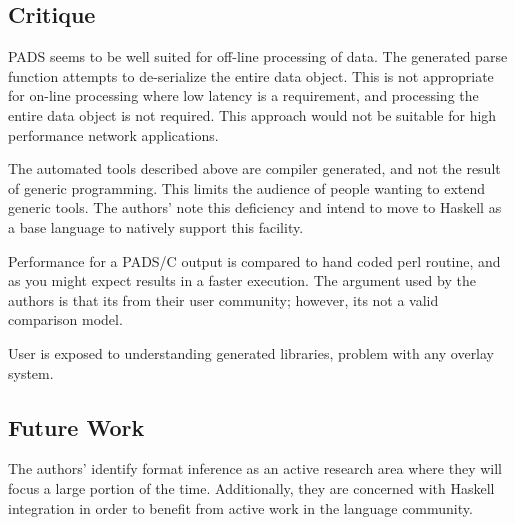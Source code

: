 \subsection{Critique}

PADS seems to be well suited for off-line processing of data. The generated 
parse function attempts to de-serialize the entire data object. This is not
appropriate for on-line processing where low latency is a requirement, and
processing the entire data object is not required. This approach would not
be suitable for high performance network applications. 

The automated tools described above are compiler generated, and not the result
of generic programming. This limits the audience of people wanting to extend
generic tools. The authors' note this deficiency and intend to move to Haskell
as a base language to natively support this facility.

Performance for a PADS/C output is compared to hand coded perl routine, and as 
you might expect results in a faster execution. The argument used by the authors
is that its from their user community; however, its not a valid comparison model.

User is exposed to understanding generated libraries, problem with any overlay
system.

\subsection{Future Work}

The authors' identify format inference as an active research area where they
will focus a large portion of the time. Additionally, they are concerned with
Haskell integration in order to benefit from active work in the language
community.
